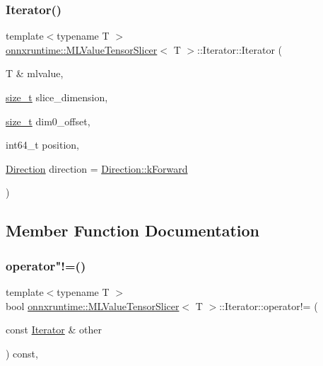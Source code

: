\subsubsection{\texorpdfstring{Iterator()}{Iterator()}}
{\footnotesize\ttfamily template$<$typename T $>$ \\
\mbox{\hyperlink{classonnxruntime_1_1MLValueTensorSlicer}{onnxruntime\+::\+M\+L\+Value\+Tensor\+Slicer}}$<$ T $>$\+::Iterator\+::\+Iterator (\begin{DoxyParamCaption}\item[{T \&}]{mlvalue,  }\item[{\mbox{\hyperlink{mlasi_8h_a503efbc1c6e50825320ad909366b78ab}{size\+\_\+t}}}]{slice\+\_\+dimension,  }\item[{\mbox{\hyperlink{mlasi_8h_a503efbc1c6e50825320ad909366b78ab}{size\+\_\+t}}}]{dim0\+\_\+offset,  }\item[{int64\+\_\+t}]{position,  }\item[{\mbox{\hyperlink{classonnxruntime_1_1MLValueTensorSlicer_1_1Iterator_ad83ea2768d16fdaead62f58e6190a0c1}{Direction}}}]{direction = {\ttfamily \mbox{\hyperlink{classonnxruntime_1_1MLValueTensorSlicer_1_1Iterator_ad83ea2768d16fdaead62f58e6190a0c1ae7c3602dce09c755e09250077a601a51}{Direction\+::k\+Forward}}} }\end{DoxyParamCaption})\hspace{0.3cm}{\ttfamily [explicit]}}



\subsection{Member Function Documentation}
\mbox{\label{classonnxruntime_1_1MLValueTensorSlicer_1_1Iterator_a091b61988d4a78e6fb3f8d9b1de7d468}} 
\subsubsection{\texorpdfstring{operator"!=()}{operator!=()}}
{\footnotesize\ttfamily template$<$typename T $>$ \\
bool \mbox{\hyperlink{classonnxruntime_1_1MLValueTensorSlicer}{onnxruntime\+::\+M\+L\+Value\+Tensor\+Slicer}}$<$ T $>$\+::Iterator\+::operator!= (\begin{DoxyParamCaption}\item[{const \mbox{\hyperlink{classonnxruntime_1_1MLValueTensorSlicer_1_1Iterator}{Iterator}} \&}]{other }\end{DoxyParamCaption}) const\hspace{0.3cm}{\ttfamily [inline]}, {\ttfamily [noexcept]}}


